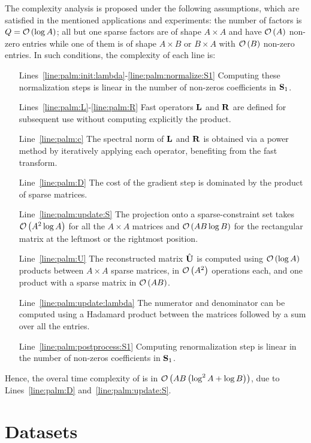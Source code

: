 The complexity analysis is proposed under the following assumptions, which are satisfied in the mentioned applications and experiments: the number of factors is $Q=\mathcal{O}\left (\log A\right )$; all but one sparse factors are of shape $A \times A$ and have $\mathcal{O}\left(A\right)$ non-zero entries while one of them is of shape $A\times B$ or $B\times A$ with $\mathcal{O}\left(B\right)$ non-zero entries.
In such conditions, the complexity of each line is:
\begin{itemize}
 \item [Lines~\ref{line:palm:init:lambda}-\ref{line:palm:normalize:S1}] Computing these normalization steps is linear in the number of non-zeros coefficients in ${\mathbf{S}}_1$.
 \item [Lines~\ref{line:palm:L}-\ref{line:palm:R}] Fast operators ${\mathbf{L}}$ and ${\mathbf{R}}$ are defined for subsequent use without computing explicitly the product.
 \item [Line~\ref{line:palm:c}] The spectral norm of ${\mathbf{L}}$ and ${\mathbf{R}}$ is obtained via a power method by iteratively applying each operator, benefiting from the fast transform.
 \item [Line~\ref{line:palm:D}] The cost of the gradient step is dominated by the product of sparse matrices.
\item [Line~\ref{line:palm:update:S}] The projection onto a sparse-constraint set takes $\mathcal{O}\left(A^2\log A\right)$ for all the $A\times A$ matrices and $\mathcal{O}\left(AB\log B\right)$ for the rectangular matrix at the leftmost or the rightmost position.
 \item [Line~\ref{line:palm:U}] The reconstructed matrix $\hat {{\mathbf{U}}}$ is computed using $\mathcal{O}\left(\log A\right)$ products between $A\times A$ sparse matrices, in $\mathcal{O}\left(A^2\right)$ operations each, and one product with a sparse matrix in $\mathcal{O}\left(AB\right)$.
 \item [Line~\ref{line:palm:update:lambda}] The numerator and denominator can be computed using a Hadamard product between the matrices followed by a sum over all the entries.
  \item [Line~\ref{line:palm:postprocess:S1}] Computing renormalization step is linear in the number of non-zeros coefficients in ${\mathbf{S}}_1$.
\end{itemize}

Hence, the overal time complexity of \palm is in $\mathcal{O}\left(AB\left (\log^2 A+\log B\right )\right)$, due to Lines~\ref{line:palm:D} and~\ref{line:palm:update:S}.

\section{Datasets}
\label{supp:datasets}

